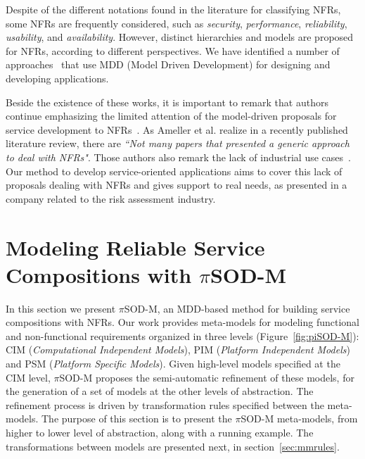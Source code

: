 \documentclass{singlecol-new}
\theoremstyle{TH}{
\newtheorem{lemma}{Lemma}
\newtheorem{theorem}[lemma]{Theorem}
\newtheorem{corrolary}[lemma]{Corrolary}
\newtheorem{conjecture}[lemma]{Conjecture}
\newtheorem{proposition}[lemma]{Proposition}
\newtheorem{claim}[lemma]{Claim}
\newtheorem{stheorem}[lemma]{Wrong Theorem}
\newtheorem{algorithm}{Algorithm}
}
\theoremstyle{THrm}{
\newtheorem{definition}{Definition}[section]
\newtheorem{question}{Question}[section]
\newtheorem{remark}{Remark}
\newtheorem{scheme}{Scheme}
}
\theoremstyle{THhit}{
\newtheorem{case}{Case}[section]
}
\theoremstyle{THhsl}{
\newtheorem{example}{Example}
}
\newcommand{\pisodm}[0]{$\pi$SOD-M\xspace}
\begin{document}
Despite of the different notations found in the literature for classifying NFRs, some NFRs are frequently considered, such as \textit{security}, \textit{performance}, \textit{reliability}, \textit{usability}, and \textit{availability}.
However, distinct hierarchies and models are proposed for NFRs, according to different perspectives.
We have identified a number of approaches~\cite{DAmbrogio06,CholletL09,SchmelingCM11,BasinDL06,Fabra2011,OvaskaEHPA10} that use MDD (Model Driven Development) for designing and developing applications.

Beside the existence of these works, it is important to remark that authors continue emphasizing the limited attention of the model-driven proposals for service development to NFRs~\cite{Ameller201542,Ameller2010,SouzaNeto201684}. 
As Ameller et al. realize in a recently published literature review, there are \textit{``Not many papers that presented a generic approach to deal with NFRs"}. Those authors also remark the lack of industrial use cases~\cite{Ameller201542}. 
Our method to develop service-oriented applications aims to cover this lack of proposals dealing with NFRs and gives support to real needs, as presented in a company related to the risk assessment industry.


\section{Modeling Reliable Service Compositions with \pisodm}\label{sec:motivation}

In this section we present \pisodm, an MDD-based method for building service compositions with NFRs.
Our work provides meta-models for modeling functional and non-functional requirements organized in three levels (Figure~\ref{fig:piSOD-M}): CIM (\textit{Computational Independent Models}), PIM (\textit{Plat\-form Independent Models}) and PSM (\textit{Platform Specific Models}).
Given  high-level models specified at the CIM level, \pisodm proposes the semi-automatic refinement of these models, for the generation of a set of models at the other levels of abstraction.
The refinement process is driven by transformation rules specified between the meta-models.
%
The purpose of this section is to present the \pisodm me\-ta-models, from higher to lower level of abstraction, along with a running example.
The transformations between models are presented next, in section~\ref{sec:mmrules}.
\end{document}
